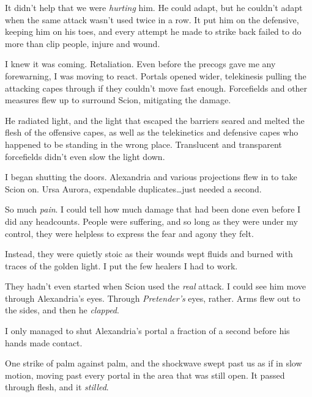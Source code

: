 It didn't help that we were \emph{hurting} him.  He could adapt, but he couldn't adapt when the same attack wasn't used twice in a row.  It put him on the defensive, keeping him on his toes, and every attempt he made to strike back failed to do more than clip people, injure and wound.



I knew it was coming.  Retaliation.  Even before the precogs gave me any forewarning, I was moving to react.  Portals opened wider, telekinesis pulling the attacking capes through if they couldn't move fast enough.  Forcefields and other measures flew up to surround Scion, mitigating the damage.



He radiated light, and the light that escaped the barriers seared and melted the flesh of the offensive capes, as well as the telekinetics and defensive capes who happened to be standing in the wrong place.  Translucent and transparent forcefields didn't even slow the light down.



I began shutting the doors.  Alexandria and various projections flew in to take Scion on.  Ursa Aurora, expendable duplicates\ldots just needed a second.



So much \emph{pain}.  I could tell how much damage that had been done even before I did any headcounts.  People were suffering, and so long as they were under my control, they were helpless to express the fear and agony they felt.



Instead, they were quietly stoic as their wounds wept fluids and burned with traces of the golden light.  I put the few healers I had to work.



They hadn't even started when Scion used the \emph{real} attack.  I could see him move through Alexandria's eyes.  Through \emph{Pretender's }eyes, rather.  Arms flew out to the sides, and then he \emph{clapped}.



I only managed to shut Alexandria's portal a fraction of a second before his hands made contact.



One strike of palm against palm, and the shockwave swept past us as if in slow motion, moving past every portal in the area that was still open.  It passed through flesh, and it \emph{stilled}.



